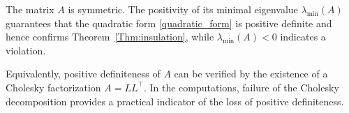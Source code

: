 \documentclass[12pt]{amsart}
\newcommand{\1}{{\bf 1}}
\begin{document}
\noindent
The matrix \( A \) is symmetric. The positivity of its minimal eigenvalue \( \lambda_{\min}(A) \) guarantees that the quadratic form \eqref{quadratic_form} is positive definite and hence confirms Theorem~\ref{Thm:insulation}, while \( \lambda_{\min}(A) < 0 \) indicates a violation.

Equivalently, positive definiteness of \( A \) can be verified by the existence of a Cholesky factorization \( A = LL^\top \). In the computations, failure of the Cholesky decomposition provides a practical indicator of the loss of positive definiteness.

\end{document}
